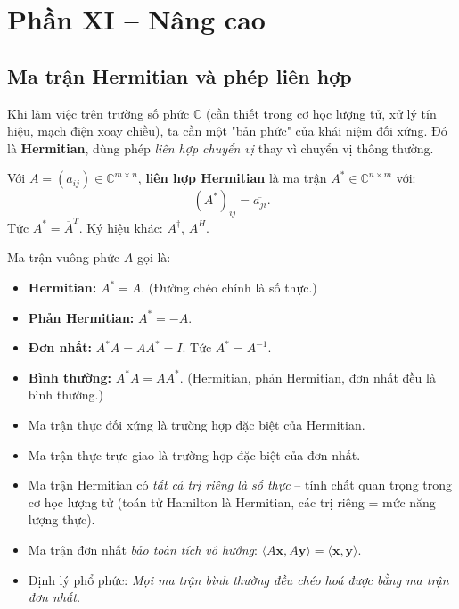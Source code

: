 \documentclass[12pt,a4paper]{article}
\begin{document}
\newpage

\section{Phần XI -- Nâng cao}

\subsection{Ma trận Hermitian và phép liên hợp}

\begin{dongco}
Khi làm việc trên trường số phức $\mathbb{C}$ (cần thiết trong cơ học lượng tử, xử lý tín hiệu, mạch điện xoay chiều), ta cần một "bản phức" của khái niệm đối xứng. Đó là \textbf{Hermitian}, dùng phép \emph{liên hợp chuyển vị} thay vì chuyển vị thông thường.
\end{dongco}

\begin{dinhnghia}
  Với $A = (a_{ij}) \in \mathbb{C}^{m\times n}$, \textbf{liên hợp Hermitian} là ma trận $A^* \in \mathbb{C}^{n\times m}$ với:
  \[
    (A^*)_{ij} = \overline{a_{ji}}.
  \]
  Tức $A^* = \overline{A}^T$. Ký hiệu khác: $A^\dagger$, $A^H$.

  Ma trận vuông phức $A$ gọi là:
  \begin{itemize}
    \item \textbf{Hermitian:} $A^* = A$. (Đường chéo chính là số thực.)
    \item \textbf{Phản Hermitian:} $A^* = -A$.
    \item \textbf{Đơn nhất:} $A^* A = A A^* = I$. Tức $A^* = A^{-1}$.
    \item \textbf{Bình thường:} $A^* A = A A^*$. (Hermitian, phản Hermitian, đơn nhất đều là bình thường.)
  \end{itemize}
\end{dinhnghia}

\begin{luuy}
\begin{itemize}
  \item Ma trận thực đối xứng là trường hợp đặc biệt của Hermitian.
  \item Ma trận thực trực giao là trường hợp đặc biệt của đơn nhất.
  \item Ma trận Hermitian có \emph{tất cả trị riêng là số thực} -- tính chất quan trọng trong cơ học lượng tử (toán tử Hamilton là Hermitian, các trị riêng = mức năng lượng thực).
  \item Ma trận đơn nhất \emph{bảo toàn tích vô hướng}: $\langle A\mathbf{x}, A\mathbf{y}\rangle = \langle \mathbf{x}, \mathbf{y}\rangle$.
  \item Định lý phổ phức: \emph{Mọi ma trận bình thường đều chéo hoá được bằng ma trận đơn nhất.}
\end{itemize}
\end{luuy}
\end{document}
